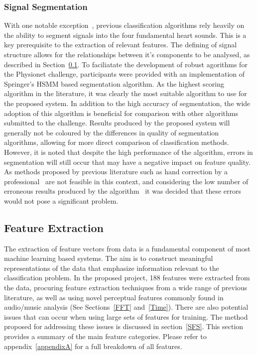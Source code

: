 \documentclass[titlepage, 12pt]{scrartcl} \usepackage{enumitem}
\begin{document}
\subsubsection{Signal Segmentation}
With one notable exception~\parencite{Langley2016}, previous classification
algorithms rely heavily on the ability to segment signals into the four
fundamental heart sounds. This is a key prerequisite to the extraction of
relevant features. The defining of signal structure allows for the
relationships between it's components to be analysed, as described in
Section~\ref{featEx}. To faciliatate the development of robust agorithms for
the Physionet challenge, participants were provided with an implementation of
Springer's HSMM based segmentation algorithm. As the highest scoring algorithm
in the literature, it was clearly the most suitable algorithm to use for the
proposed system. In addition to the high accuracy of segmentation, the wide
adoption of this algorithm is beneficial for comparison with other algorithms
submitted to the challenge. Results produced by the proposed system will
generally not be coloured by the differences in quality of segmentation
algorithms, allowing for more direct comparison of classification methods.
However, it is noted that despite the high performance of the algorithm, errors
in segmentation will still occur that may have a negative impact on feature
quality. As methods proposed by previous literature such as hand correction by
a professional~\parencite[p.2203]{Liu2016} are not feasible in this context,
and considering the low number of erroneous results produced by the
algorithm~\parencite[p.2]{Goda2016} it was decided that these errors would not
pose a significant problem.


\subsection{Feature Extraction}\label{featEx}
The extraction of feature vectors from data is a fundamental component of most
machine learning based systems. The aim is to construct meaningful
representations of the data that emphasize information relevant to the
classification problem. In the proposed project, 188 features were extracted
from the data, procuring feature extraction techniques from a wide range of
previous literature, as well as using novel perceptual features commonly found
in audio/music analysis (See Sections~\ref{FFT} and~\ref{Time}).
There are also potential issues that can occur when using large sets of
features for training. The method proposed for addressing these issues is
discussed in section~\ref{SFS}. This section provides a summary of the main
feature categories. Please refer to appendix~\ref{appendixA} for a full
breakdown of all features.
\end{document}
